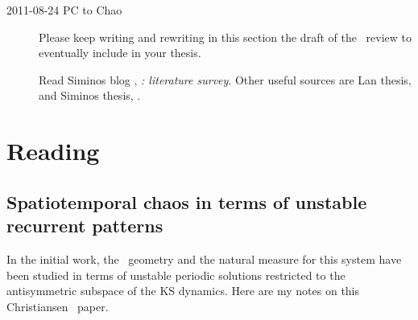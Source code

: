 \begin{description}

\item[2011-08-24 PC to Chao]
Please keep writing and rewriting in this section the draft of the
\KSe\ review to eventually include in your thesis.

Read Siminos blog , \emph{ \KS: literature survey}.
Other useful sources are Lan thesis,  and Siminos
thesis, .


\end{description}


\section{Reading}
\label{s:KSreading}

\subsection{Spatiotemporal chaos in terms of unstable recurrent patterns}
\label{s:Christiansen97}

In the initial work, the \statesp\ geometry and the natural measure for
this system have been
studied in terms of unstable
periodic solutions restricted to the antisymmetric subspace of the
KS dynamics. Here are my notes on this Christiansen \etal\ paper.

